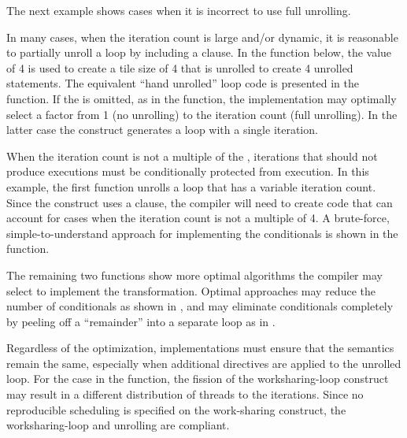 The next example shows cases when it is incorrect to use full unrolling.


In many cases, when the iteration count is large and/or dynamic, it is
reasonable to partially unroll a loop by including a  clause.
In the  function below, the  value
of 4 is used to create a tile size of 4 that is unrolled to create 4 unrolled statements.
The equivalent ``hand unrolled'' loop code is presented in the 
 function.
If the  is omitted, as in the  
function, the implementation may optimally select a factor from 1 
(no unrolling) to the iteration count (full unrolling).  
In the latter case the construct generates a loop with a single iteration.


When the iteration count is not a multiple of the ,
iterations that should not produce executions must be conditionally
protected from execution. In this example, the first function
unrolls a loop that has a variable iteration count. Since the 
construct uses a  clause, the compiler will need to
create code that can account for cases when the iteration count is not a
multiple of 4. A brute-force, simple-to-understand approach for implementing 
the conditionals is shown in the  function.

The remaining two functions show more optimal algorithms the compiler 
may select to implement the transformation.
Optimal approaches may reduce the number of conditionals as shown in 
, and 
may eliminate conditionals completely by peeling off a ``remainder'' 
into a separate loop as in . 

Regardless of the optimization, implementations must ensure that the semantics
remain the same, especially when additional directives are applied to
the unrolled loop. For the case in the 
function, the fission of the worksharing-loop construct may result in a different
distribution of threads to the iterations. Since no reproducible scheduling
is specified on the work-sharing construct, the worksharing-loop and unrolling are compliant.

